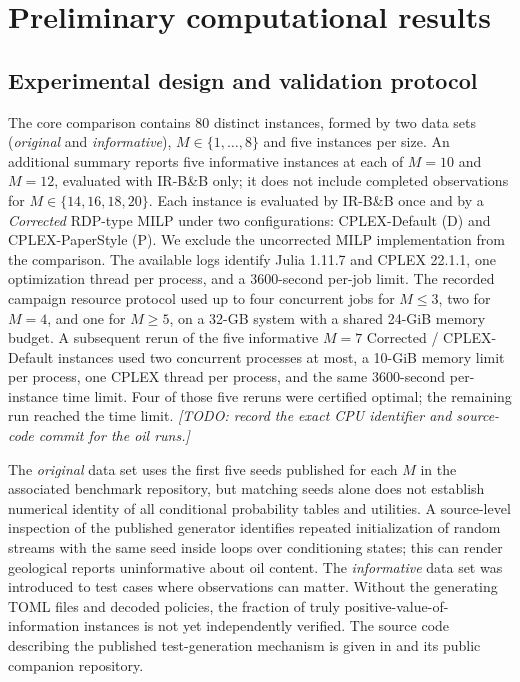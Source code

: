 \documentclass[11pt,a4paper]{article}
\begin{document}
\section{Preliminary computational results}\label{sec:results}
\subsection{Experimental design and validation protocol}
The core comparison contains $80$ distinct instances, formed by two data sets (\emph{original} and \emph{informative}), $M\in\{1,\dots,8\}$ and five instances per size. An additional summary reports five informative instances at each of $M=10$ and $M=12$, evaluated with IR-B\&B only; it does not include completed observations for $M\in\{14,16,18,20\}$. Each instance is evaluated by IR-B\&B once and by a \emph{Corrected} RDP-type MILP under two configurations: CPLEX-Default (D) and CPLEX-PaperStyle (P). We exclude the uncorrected MILP implementation from the comparison. The available logs identify Julia 1.11.7 and CPLEX 22.1.1, one optimization thread per process, and a 3600-second per-job limit. The recorded campaign resource protocol used up to four concurrent jobs for $M\le3$, two for $M=4$, and one for $M\ge5$, on a 32-GB system with a shared 24-GiB memory budget. A subsequent rerun of the five informative $M=7$ Corrected / CPLEX-Default instances used two concurrent processes at most, a 10-GiB memory limit per process, one CPLEX thread per process, and the same 3600-second per-instance time limit. Four of those five reruns were certified optimal; the remaining run reached the time limit. {\color{BrickRed}\emph{[TODO: record the exact CPU identifier and source-code commit for the oil runs.]}}

The \emph{original} data set uses the first five seeds published for each $M$ in the associated benchmark repository, but matching seeds alone does not establish numerical identity of all conditional probability tables and utilities. A source-level inspection of the published generator identifies repeated initialization of random streams with the same seed inside loops over conditioning states; this can render geological reports uninformative about oil content. The \emph{informative} data set was introduced to test cases where observations can matter. Without the generating TOML files and decoded policies, the fraction of truly positive-value-of-information instances is not yet independently verified. The source code describing the published test-generation mechanism is given in \cite{Terho2026} and its public companion repository.
\end{document}
